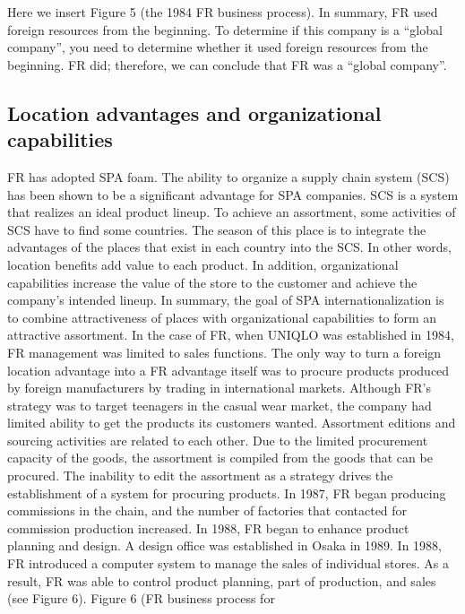 \documentclass[12pt,]{article}
\begin{document}
Here we insert Figure 5 (the 1984 FR business process). In summary, FR
used foreign resources from the beginning. To determine if this company
is a ``global company'', you need to determine whether it used foreign
resources from the beginning. FR did; therefore, we can conclude that FR
was a ``global company''.

\hypertarget{location-advantages-and-organizational-capabilities}{%
\subsection{Location advantages and organizational
capabilities}\label{location-advantages-and-organizational-capabilities}}

FR has adopted SPA foam. The ability to organize a supply chain system
(SCS) has been shown to be a significant advantage for SPA companies.
SCS is a system that realizes an ideal product lineup. To achieve an
assortment, some activities of SCS have to find some countries. The
season of this place is to integrate the advantages of the places that
exist in each country into the SCS. In other words, location benefits
add value to each product. In addition, organizational capabilities
increase the value of the store to the customer and achieve the
company's intended lineup. In summary, the goal of SPA
internationalization is to combine attractiveness of places with
organizational capabilities to form an attractive assortment. In the
case of FR, when UNIQLO was established in 1984, FR management was
limited to sales functions. The only way to turn a foreign location
advantage into a FR advantage itself was to procure products produced by
foreign manufacturers by trading in international markets. Although FR's
strategy was to target teenagers in the casual wear market, the company
had limited ability to get the products its customers wanted. Assortment
editions and sourcing activities are related to each other. Due to the
limited procurement capacity of the goods, the assortment is compiled
from the goods that can be procured. The inability to edit the
assortment as a strategy drives the establishment of a system for
procuring products. In 1987, FR began producing commissions in the
chain, and the number of factories that contacted for commission
production increased. In 1988, FR began to enhance product planning and
design. A design office was established in Osaka in 1989. In 1988, FR
introduced a computer system to manage the sales of individual stores.
As a result, FR was able to control product planning, part of
production, and sales (see Figure 6). Figure 6 (FR business process for
\end{document}
